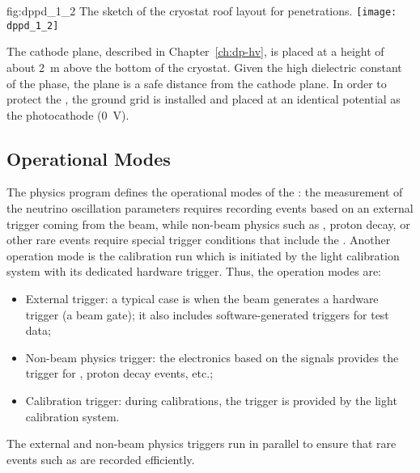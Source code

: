 \begin{dunefigure}{fig:dppd_1_2}
{The sketch of the cryostat roof layout for \dual {} penetrations.}
\texttt{[image: dppd\_1\_2]}
\end{dunefigure}

The cathode plane, described in Chapter~\ref{ch:dp-hv}, is placed at a height of about \SI{2}{m} above the bottom of the cryostat. Given the high dielectric constant of the \lar phase, the  plane is a safe distance from the cathode plane. In order to protect the , the ground grid is installed and placed at an identical potential as the  photocathode (\SI{0}{V}).

\subsection{Operational Modes} %
\label{sec:dp-pds-oveerview_operation}

The physics program defines the operational modes of the \dual {}: the measurement of the neutrino oscillation parameters requires recording events based on an external trigger coming from the beam, while non-beam physics such as , proton decay, or other rare events require special trigger conditions that include the . Another operation mode is the  calibration run which is initiated by the light calibration system with its dedicated hardware trigger.
%
Thus, the operation modes are:
\begin{itemize}
\item External trigger: %
a typical case is when the beam generates a hardware trigger (a beam gate);  it also includes software-generated triggers for test data;
\item Non-beam physics trigger: the electronics based on the  signals provides the trigger for , proton decay events, etc.;
\item Calibration trigger: during  calibrations, the trigger is provided by the light calibration system.
\end{itemize}

The external and non-beam physics triggers run in parallel to ensure that rare events such as  are recorded efficiently. 

